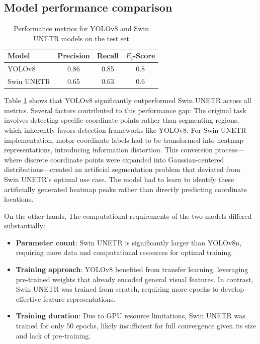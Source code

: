 \documentclass{article}
\begin{document}
\subsection{Model performance comparison}

\begin{table}[htb]
    \centering
    \caption{Performance metrics for YOLOv8 and Swin UNETR models on the test set}
    \begin{tabular}{lccc}
        \toprule
        Model & Precision & Recall & $F_2$-Score \\
        \midrule
        YOLOv8 & 0.86 & 0.85 & 0.8 \\
        Swin UNETR & 0.65 & 0.63 & 0.6 \\
        \bottomrule
    \end{tabular}
    \label{tab:combined_results}
\end{table}

Table \ref{tab:combined_results} shows that YOLOv8 significantly outperformed Swin UNETR across all metrics. Several factors contributed to this performance gap:
The original task involves detecting specific coordinate points rather than segmenting regions, which inherently favors detection frameworks like YOLOv8. For Swin UNETR implementation, motor coordinate labels had to be transformed into heatmap representations, introducing information distortion. This conversion process—where discrete coordinate points were expanded into Gaussian-centered distributions—created an artificial segmentation problem that deviated from Swin UNETR's optimal use case. The model had to learn to identify these artificially generated heatmap peaks rather than directly predicting coordinate locations.

On the other hands, The computational requirements of the two models differed substantially:

\begin{itemize}
    \item \textbf{Parameter count}: Swin UNETR is significantly larger than YOLOv8n, requiring more data and computational resources for optimal training.
    \item \textbf{Training approach}: YOLOv8 benefited from transfer learning, leveraging pre-trained weights that already encoded general visual features. In contrast, Swin UNETR was trained from scratch, requiring more epochs to develop effective feature representations.
    \item \textbf{Training duration}: Due to GPU resource limitations, Swin UNETR was trained for only 50 epochs, likely insufficient for full convergence given its size and lack of pre-training.
\end{itemize}
\end{document}
